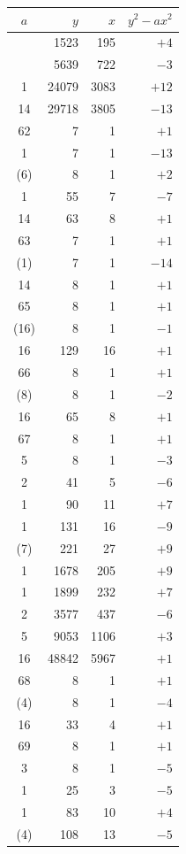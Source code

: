 \documentclass[11pt]{article}
\begin{document}
\begin{center}
\renewcommand{\arraystretch}{1.05}
\begin{tabular}{|c|r|r|r|}
\hline
$a$ & $y$ & $x$ & $y^2 - ax^2$ \\
\hline
 & 1523 & 195 & $+4$ \\
 & 5639 & 722 & $-3$ \\
1 & 24079 & 3083 & $+12$ \\
14 & 29718 & 3805 & $-13$ \\
\hline
62 & 7 & 1 & $+1$ \\
1 & 7 & 1 & $-13$ \\
(6) & 8 & 1 & $+2$ \\
1 & 55 & 7 & $-7$ \\
14 & 63 & 8 & $+1$ \\
\hline
63 & 7 & 1 & $+1$ \\
(1) & 7 & 1 & $-14$ \\
14 & 8 & 1 & $+1$ \\
\hline
65 & 8 & 1 & $+1$ \\
(16) & 8 & 1 & $-1$ \\
16 & 129 & 16 & $+1$ \\
\hline
66 & 8 & 1 & $+1$ \\
(8) & 8 & 1 & $-2$ \\
16 & 65 & 8 & $+1$ \\
\hline
67 & 8 & 1 & $+1$ \\
5 & 8 & 1 & $-3$ \\
2 & 41 & 5 & $-6$ \\
1 & 90 & 11 & $+7$ \\
1 & 131 & 16 & $-9$ \\
(7) & 221 & 27 & $+9$ \\
1 & 1678 & 205 & $+9$ \\
1 & 1899 & 232 & $+7$ \\
2 & 3577 & 437 & $-6$ \\
5 & 9053 & 1106 & $+3$ \\
16 & 48842 & 5967 & $+1$ \\
\hline
68 & 8 & 1 & $+1$ \\
(4) & 8 & 1 & $-4$ \\
16 & 33 & 4 & $+1$ \\
\hline
69 & 8 & 1 & $+1$ \\
3 & 8 & 1 & $-5$ \\
1 & 25 & 3 & $-5$ \\
1 & 83 & 10 & $+4$ \\
(4) & 108 & 13 & $-5$ \\

\end{tabular}
\end{center}
\end{document}
